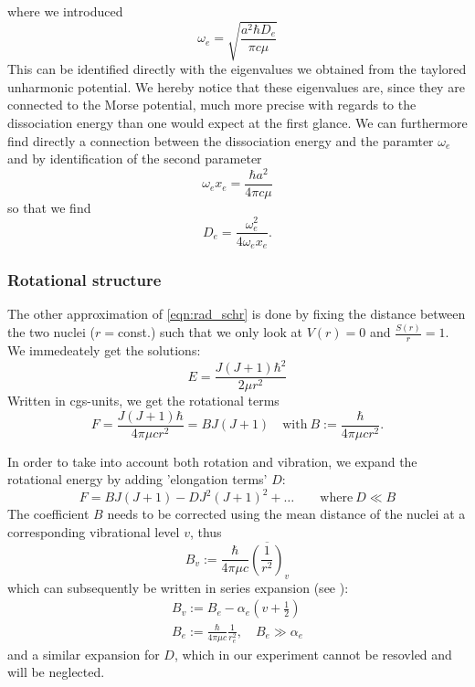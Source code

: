 where we introduced
\begin{equation}
    \omega_{e} = \sqrt{\frac{a^2 \hbar D_e}{\pi c \mu}}
    \label{eqn:w_e}
\end{equation}
This can be identified directly with the eigenvalues we obtained
from the taylored unharmonic potential. We hereby notice that these
eigenvalues are, since they are connected to the Morse potential,
much more precise with regards to the dissociation energy than
one would expect at the first glance. We can furthermore
find directly a connection between the dissociation energy and 
the paramter $\omega_e$ and by identification of the second
parameter
\begin{equation}
    \omega_e x_e = \frac{\hbar a^2}{4\pi c \mu}
    \label{eqn:wx_e}
\end{equation}
so that we find 
\begin{equation}
    D_e = \frac{\omega_e^2}{4 \omega_e x_e}.
    \label{eqn:D_e}
\end{equation}


\subsubsection{Rotational structure}
The other approximation of \eqref{eqn:rad_schr}
is done by fixing the distance between the two 
nuclei ($r =$const.) such that 
we only look at $V(r)=0$ and $\frac{S(r)}{r} = 1$. We immedeately get
the solutions:
\begin{equation}
    E = \frac{J(J+1)\hbar^2}{2\mu r^2}
\end{equation}
Written in cgs-units, we get the rotational terms
\begin{equation}
    F = \frac{J(J+1)\hbar}{4 \pi \mu c r^2} = B J (J + 1) \quad 
    \mathrm{ with \ } B := \frac{\hbar}{4 \pi \mu c r^2}.
\end{equation}

In order to take into account both rotation and vibration, we expand 
the rotational energy by adding 'elongation terms' $D$:
\begin{equation}
    F = B J (J + 1) - D J^2 (J + 1)^2 + \ldots 
    \qquad \mathrm{where \ } D \ll B
    \label{eqn:E_rot}
\end{equation}
The coefficient $B$ needs to be corrected using the mean distance of 
the nuclei at a corresponding vibrational level $v$, thus 
\begin{equation}
    B_v := \frac{\hbar}{4 \pi \mu c} \overline{\left( \frac{1}{r^2}\right)}_v
\end{equation}
which can subsequently be written in series expansion 
(see \cite{herzberg1950spectra}):
\begin{eqnarray}
    B_v := B_e - \alpha_e \left (v + \frac{1}{2}\right ) 
    \label{eqn:B_v}\\
    B_e := \frac{\hbar}{4 \pi \mu c} \frac{1}{r_e^2}, \quad B_e \gg \alpha_e
    \label{eqn:B_e}
\end{eqnarray}
and a similar expansion for $D$, which in our experiment cannot be resovled 
and will be neglected.


